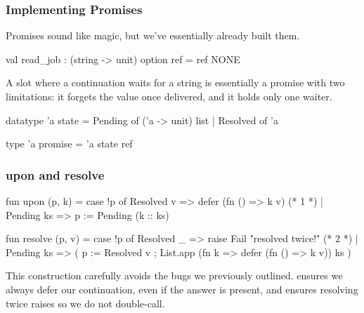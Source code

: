 \documentclass[aspectratio=169]{beamer}
\begin{document}
\begin{frame}[fragile]
  \frametitle{Implementing Promises}

  Promises sound like magic, but we've essentially already built them.

  \pause
  \vspace{\fill}

  \begin{codeblock}
    val read_job : (string -> unit) option ref = ref NONE
\end{codeblock}

  \pause
  \vspace{\fill}

  A slot where a continuation waits for a string is essentially a promise
  with two limitations: it forgets the value once delivered, and it holds
  only one waiter.

  \pause

  \begin{codeblock}
    datatype 'a state =
        Pending of ('a -> unit) list
      | Resolved of 'a

    type 'a promise = 'a state ref
\end{codeblock}
\end{frame}

\begin{frame}[fragile]
  \frametitle{upon and resolve}

  {\small
  \begin{codeblock}
    fun upon (p, k) =
      case !p of
          Resolved v => defer (fn () => k v) (* 1 *)
        | Pending ks => p := Pending (k :: ks)

    fun resolve (p, v) =
      case !p of
          Resolved _ => raise Fail "resolved twice!" (* 2 *)
        | Pending ks =>
            ( p := Resolved v
            ; List.app (fn k => defer (fn () => k v)) ks )
\end{codeblock}
  }

  \pause
  \vspace{\fill}

  This construction carefully avoids the bugs we previously
  outlined.  ensures we always defer our continuation,
  even if the answer is present, and  ensures resolving twice
  raises so we do not double-call.
\end{frame}
\end{document}
